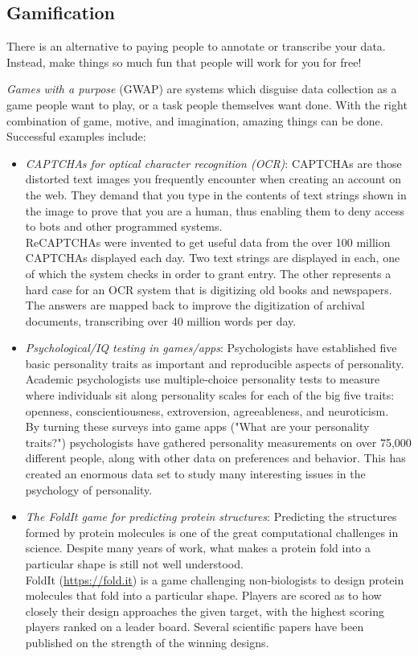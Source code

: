 \documentclass[10pt]{article}
\begin{document}
\subsection{Gamification}
There is an alternative to paying people to annotate or transcribe your data. Instead, make things so much fun that people will work for you for free!

\textit{Games with a purpose} (GWAP) are systems which disguise data collection as a game people want to play, or a task people themselves want done. With the right combination of game, motive, and imagination, amazing things can be done. Successful examples include:
\begin{itemize}
    \item \textit{CAPTCHAs for optical character recognition (OCR)}: CAPTCHAs are those distorted text images you frequently encounter when creating an account on the web. They demand that you type in the contents of text strings shown in the image to prove that you are a human, thus enabling them to deny access to bots and other programmed systems.\\
    ReCAPTCHAs were invented to get useful data from the over 100 million CAPTCHAs displayed each day. Two text strings are displayed in each, one of which the system checks in order to grant entry. The other represents a hard case for an OCR system that is digitizing old books and newspapers. The answers are mapped back to improve the digitization of archival documents, transcribing over 40 million words per day.
    \item \textit{Psychological/IQ testing in games/apps}: Psychologists have established five basic personality traits as important and reproducible aspects of personality. Academic psychologists use multiple-choice personality tests to measure where individuals sit along personality scales for each of the big five traits: openness, conscientiousness, extroversion, agreeableness, and neuroticism.\\
    By turning these surveys into game apps ("What are your personality traits?") psychologists have gathered personality measurements on over 75,000 different people, along with other data on preferences and behavior. This has created an enormous data set to study many interesting issues in the psychology of personality.
    \item \textit{The FoldIt game for predicting protein structures}: Predicting the structures formed by protein molecules is one of the great computational challenges in science. Despite many years of work, what makes a protein fold into a particular shape is still not well understood.\\
    FoldIt (\url{https://fold.it}) is a game challenging non-biologists to design protein molecules that fold into a particular shape. Players are scored as to how closely their design approaches the given target, with the highest scoring players ranked on a leader board. Several scientific papers have been published on the strength of the winning designs.
\end{itemize}
\end{document}
